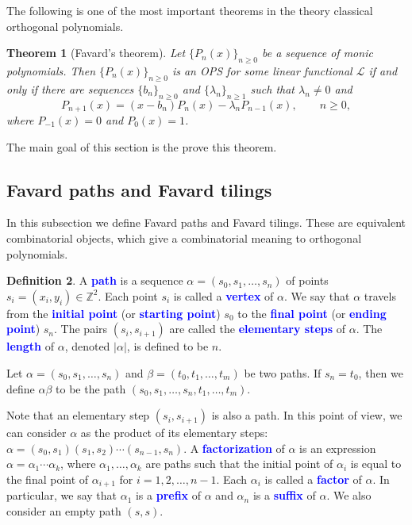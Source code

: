 \documentclass{amsart}
\numberwithin{equation}{section}
\newtheorem{thm}{Theorem}[section]
\theoremstyle{definition}
\newtheorem{defn}[thm]{Definition}
\newcommand{\ZZ}{\mathbb{Z}}
\newcommand\LL{\mathcal{L}}
\renewcommand\emph[1]{\textcolor{blue}{\bf #1}}
\begin{document}
The following is one of the most important theorems
in the theory classical orthogonal polynomials.

\begin{thm}[Favard's theorem]
  Let \( \{ P_n(x) \}_{n\ge 0} \) be a sequence of monic polynomials.
  Then \( \{ P_n(x) \}_{n\ge 0} \) is an OPS for some linear
  functional \( \LL \) if and only if
  there are sequences \( \{ b_n\}_{n\ge 0} \) and \( \{ \lambda_n\}_{n\ge 1} \)
  such that \( \lambda_n\ne 0 \) and
  \begin{equation}\label{eq:3-RR}
    P_{n+1}(x) = (x-b_n) P_n(x) - \lambda_n P_{n-1}(x), \qquad n\ge0,
  \end{equation}
  where \( P_{-1}(x) = 0 \) and \( P_0(x) = 1 \).
\end{thm}

The main goal of this section is the prove this theorem.

\subsection{Favard paths and Favard tilings}

In this subsection we define Favard paths and Favard tilings. These
are equivalent combinatorial objects, which give a combinatorial
meaning to orthogonal polynomials.


\begin{defn}
  A \emph{path} is a sequence \( \alpha=(s_0,s_1,\dots,s_n) \) of
  points \( s_i=(x_i,y_i) \in \ZZ^2 \). Each point \( s_i \) is
  called a \emph{vertex} of \( \alpha \). We say that \( \alpha \)
  travels from the \emph{initial point} (or \emph{starting point})
  \( s_0 \) to the \emph{final point} (or \emph{ending point})
  \( s_n \). The pairs \( (s_i,s_{i+1}) \) are called the
  \emph{elementary steps} of \( \alpha \). The \emph{length} of
  \( \alpha \), denoted \( |\alpha| \), is defined to be \( n \).
\end{defn}

Let \( \alpha=(s_0,s_1,\dots,s_n) \) and
\( \beta=(t_0,t_1,\dots,t_{m}) \) be two paths. If \( s_n = t_0 \),
then we define \( \alpha\beta \) to be the path
\( (s_0,s_1,\dots,s_n,t_1,\dots,t_{m}) \). 

Note that an elementary step \( (s_{i},s_{i+1}) \) is also a path. In
this point of view, we can consider \( \alpha \) as the product of its
elementary steps:
\( \alpha=(s_0,s_1) (s_1,s_2) \cdots (s_{n-1},s_n) \). A
\emph{factorization} of \( \alpha \) is an expression
\( \alpha=\alpha_1 \cdots \alpha_k \), where
\( \alpha_1,\dots,\alpha_k \) are paths such that the initial point of
\( \alpha_i \) is equal to the final point of \( \alpha_{i+1} \) for
\( i=1,2,\dots,n-1 \). Each \( \alpha_i \) is called a \emph{factor}
of \( \alpha \). In particular, we say that \( \alpha_1 \) is a
\emph{prefix} of \( \alpha \) and \( \alpha_n \) is a \emph{suffix} of
\( \alpha \). We also consider an empty path \( (s,s) \).
\end{document}
